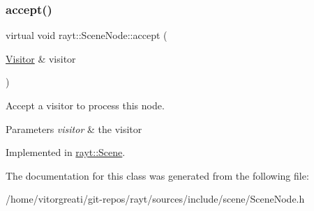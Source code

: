 \subsubsection{\texorpdfstring{accept()}{accept()}}
{\footnotesize\ttfamily virtual void rayt\+::\+Scene\+Node\+::accept (\begin{DoxyParamCaption}\item[{\mbox{\hyperlink{classrayt_1_1_visitor}{Visitor}} \&}]{visitor }\end{DoxyParamCaption})\hspace{0.3cm}{\ttfamily [pure virtual]}}



Accept a visitor to process this node. 


\begin{DoxyParams}{Parameters}
{\em visitor} & the visitor \\
\hline
\end{DoxyParams}


Implemented in \mbox{\hyperlink{classrayt_1_1_scene_ab39817d306a68ed6b2f7d734c0815f1c}{rayt\+::\+Scene}}.



The documentation for this class was generated from the following file\+:\begin{DoxyCompactItemize}
\item 
/home/vitorgreati/git-\/repos/rayt/sources/include/scene/Scene\+Node.\+h\end{DoxyCompactItemize}
